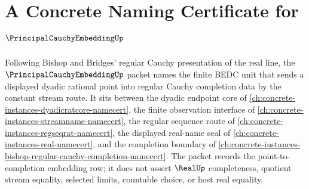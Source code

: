\chapter{A Concrete Naming Certificate for $\PrincipalCauchyEmbeddingUp$}
\label{ch:concrete-instances-principal-cauchy-embedding-namecert}

Following Bishop and Bridges' regular Cauchy presentation of the real line, the $\PrincipalCauchyEmbeddingUp$ packet names the finite BEDC unit that sends a displayed dyadic rational point into regular Cauchy completion data by the constant stream route. It sits between the dyadic endpoint core of \autoref{ch:concrete-instances-dyadicratcore-namecert}, the finite observation interface of \autoref{ch:concrete-instances-streamname-namecert}, the regular sequence route of \autoref{ch:concrete-instances-regseqrat-namecert}, the displayed real-name seal of \autoref{ch:concrete-instances-real-namecert}, and the completion boundary of \autoref{ch:concrete-instances-bishop-regular-cauchy-completion-namecert}. The packet records the point-to-completion embedding row; it does not assert $\RealUp$ completeness, quotient stream equality, selected limits, countable choice, or host real equality.

